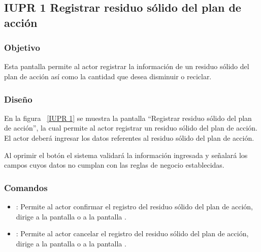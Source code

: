 \subsection{IUPR 1 Registrar residuo sólido del plan de acción}

\subsubsection{Objetivo}

      Esta pantalla permite al actor registrar la información de un residuo sólido del plan de acción así como la cantidad que desea disminuir o reciclar.

\subsubsection{Diseño}
    
    En la figura ~\ref{IUPR 1} se muestra la pantalla ``Registrar residuo sólido del plan de acción'', la cual permite al actor registrar un residuo sólido del plan de acción. 
    El actor deberá ingresar los datos referentes al residuo sólido del plan de acción.\\
 
  
    Al oprimir el botón  el sistema validará la información ingresada y señalará los campos cuyos datos no cumplan con las reglas de negocio establecidas.\\
      
    

\subsubsection{Comandos}
    \begin{itemize}
	\item {}: Permite al actor confirmar el registro del residuo sólido del plan de acción, dirige a la pantalla  o a la pantalla .
	\item {}: Permite al actor cancelar el registro del residuo sólido del plan de acción, dirige a la pantalla  o a la pantalla .
    \end{itemize}

